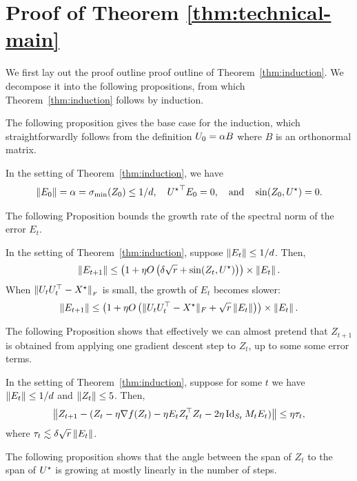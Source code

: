 \section{Proof of Theorem \ref{thm:technical-main}}\label{sec:proofprop}

We first lay out the proof outline  proof outline of Theorem~\ref{thm:induction}.
We decompose it into the following propositions, from which Theorem~\ref{thm:induction} follows by induction. 

The following proposition gives the base case for the induction, which straightforwardly follows from the definition ${U}_0 = \alpha B$ where $B$ is an orthonormal matrix. 
\begin{prop}\label{prop:base} 
	In the setting of Theorem~\ref{thm:induction}, we have 
	\begin{align*}
	\left\|E_0\right\| = \alpha =  \sigma_{\min}(Z_0) \le 1/d,\quad
	{{U}^\star}^{\top} E_0 = 0,
	\quad \text{and} \quad  \sin(Z_0, {{U}^\star})   = 0.
	\end{align*}
\end{prop}
The following Proposition bounds the growth rate of the spectral norm of the error $E_t$. 
\begin{prop}\label{prop:fullrankerror}
	In the setting of Theorem~\ref{thm:induction},  suppose $\left\|E_t\right\|\le 1/d$. Then, 
	\begin{align*}
		\left\|E_{t+1}\right\| \le \left(1+ \eta O\left(\delta \sqrt{r} + \sin(Z_{t}, {{U}^\star})  \right) \right)\times \left\|E_t\right\|.
	\end{align*}
	When $\|U_tU_t^{\top} - {X}^\star\|_{_{F}}$ is small, the growth of $E_t$
	becomes slower:
	\[ \left\|E_{t+1}\right\| \le  \left(1 + \eta O\left(\|U_tU_t^\top - {X}^\star\|_F + \sqrt{r}\left\|E_t\right\|\right)\right) \times  \left\|E_t\right\|. \]
\end{prop}
The following Proposition shows that effectively we can almost pretend that $Z_{t+1}$ is obtained from applying one gradient descent step to $Z_t$, up to some some error terms. 
\begin{prop}\label{prop:unknown}
	In the setting of Theorem~\ref{thm:induction},  suppose for some $t$ we have 
	$\left\|E_t\right\| \le 1/d$ and $\left\|Z_t\right\| \leq 5$.	Then, 
	\begin{align}
		\left\|Z_{t+1} - (Z_t - \eta \nabla f(Z_t) - \eta E_t Z_t^{\top} Z_t -2 \eta \operatorname{Id}_{S_t} M_t E_t )\right\| 	\le \eta \tau_t, \label{eqn:reduction}
	\end{align}
	where $\tau_t \lesssim \delta \sqrt{r} \left\|E_t\right\|$.
\end{prop}
The following proposition shows that the angle between the span of $Z_t$ to the span of ${{U}^\star}$ is growing at mostly linearly in the number of steps. 
